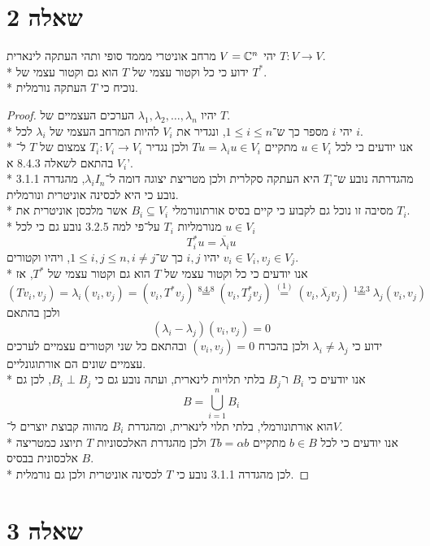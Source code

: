 \section{שאלה 2}
יהי $V = \mathbb{C}^n$ מרחב אוניטרי מממד סופי ותהי העתקה לינארית $T : V \to V$. \\*
ידוע כי כל וקטור עצמי של $T$ הוא גם וקטור עצמי של $T^*$. \\*
נוכיח כי $T$ העתקה נורמלית.
\begin{proof}
	יהיו $\lambda_1, \lambda_2, \hdots, \lambda_n$ הערכים העצמיים של $T$. \\*
	יהי $i$ מספר כך ש־$1 \le i \le n$, ונגדיר את $V_i$ להיות המרחב העצמי של $\lambda_i$ לכל $i$. \\*
	אנו יודעים כי לכל $u \in V_i$ מתקיים $T u = \lambda_i u \in V_i$ ולכן נגדיר $T_i : V_i \to V_i$ צמצום של $T$ ל־$V_i$ בהתאם לשאלה 8.4.3 א'. \\*
	מהגדרתה נובע ש־$T_i$ היא העתקה סקלרית ולכן מטריצת יצוגה דומה ל־$\lambda_i I_n$, מהגדרה 3.1.1 נובע כי היא לכסינה אוניטרית ונורמלית. \\*
	מסיבה זו נוכל גם לקבוע כי קיים בסיס אורתונורמלי $B_i \subseteq V_i$ אשר מלכסן אוניטרית את $T_i$. \\*
	מנורמליות $T_i$ על־פי למה 3.2.5 נובע גם כי לכל $u \in V_i$
	\[
		T_i^* u = \overline{\lambda_i} u \tag{1}
	\]
	יהיו $i, j$ כך ש־$1 \le i, j \le n, i \ne j$, ויהיו וקטורים $v_i \in V_i, v_j \in V_j$. \\*
	אנו יודעים כי כל וקטור עצמי של $T$ הוא גם וקטור עצמי של $T^*$, אז
	\[
		(T v_i, v_j)
		= \lambda_i (v_i, v_j) = (v_i, T^* v_j)
		\overset{\text{8.4.8}}{=} (v_i, T_j^* v_j)
		\overset{(1)}{=} (v_i, \overline{\lambda_j} v_j)
		\overset{\text{1.2.3}}{=} \lambda_j (v_i, v_j)
	\]
	ולכן בהתאם
	\[
		(\lambda_i - \lambda_j) (v_i, v_j) = 0
	\]
	ידוע כי $\lambda_i \ne \lambda_j$ ולכן בהכרח $(v_i, v_j) = 0$ ובהתאם כל שני וקטורים עצמיים לערכים עצמיים שונים הם אורתוגונליים. \\*
	אנו יודעים כי $B_i$ ו־$B_j$ בלתי תלויות לינארית, ועתה נובע גם כי $B_i \perp B_j$, לכן גם
	\[
		B = \bigcup_{i = 1}^n B_i
	\]
	הוא אורתונורמלי, בלתי תלוי לינארית, ומהגדרת $B_i$ מהווה קבוצת יוצרים ל־$V$. \\*
	אנו יודעים כי לכל $b \in B$ מתקיים $T b = \alpha b$ ולכן מהגדרת האלכסוניות $T$ תיוצג כמטריצה אלכסונית בבסיס $B$. \\*
	לכן מהגדרה 3.1.1 נובע כי $T$ לכסינה אוניטרית ולכן גם נורמלית.
\end{proof}

\section{שאלה 3}
